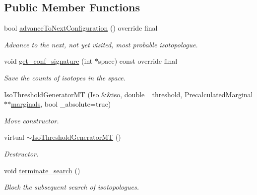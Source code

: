 \subsection*{Public Member Functions}
\begin{DoxyCompactItemize}
\item 
bool \mbox{\hyperlink{class_iso_spec_1_1_iso_threshold_generator_m_t_ab82a60de126aa926b2baf67c49015c22}{advance\+To\+Next\+Configuration}} () override final
\begin{DoxyCompactList}\small\item\em Advance to the next, not yet visited, most probable isotopologue. \end{DoxyCompactList}\item 
void \mbox{\hyperlink{class_iso_spec_1_1_iso_threshold_generator_m_t_a7c398ea67338f0d446de73ec6670dbf5}{get\+\_\+conf\+\_\+signature}} (int $\ast$space) const override final
\begin{DoxyCompactList}\small\item\em Save the counts of isotopes in the space. \end{DoxyCompactList}\item 
\mbox{\label{class_iso_spec_1_1_iso_threshold_generator_m_t_a557fc9c693ddd9980151ff6250f80fc0}} 
\mbox{\hyperlink{class_iso_spec_1_1_iso_threshold_generator_m_t_a557fc9c693ddd9980151ff6250f80fc0}{Iso\+Threshold\+Generator\+MT}} (\mbox{\hyperlink{class_iso_spec_1_1_iso}{Iso}} \&\&iso, double \+\_\+threshold, \mbox{\hyperlink{class_iso_spec_1_1_precalculated_marginal}{Precalculated\+Marginal}} $\ast$$\ast$\mbox{\hyperlink{class_iso_spec_1_1_iso_aea98a8331a2f8a1a6bbcace6124fcfae}{marginals}}, bool \+\_\+absolute=true)
\begin{DoxyCompactList}\small\item\em Move constructor. \end{DoxyCompactList}\item 
\mbox{\label{class_iso_spec_1_1_iso_threshold_generator_m_t_a761bc9e2421c3098cf55c800ddc9908c}} 
virtual \mbox{\hyperlink{class_iso_spec_1_1_iso_threshold_generator_m_t_a761bc9e2421c3098cf55c800ddc9908c}{$\sim$\+Iso\+Threshold\+Generator\+MT}} ()
\begin{DoxyCompactList}\small\item\em Destructor. \end{DoxyCompactList}\item 
\mbox{\label{class_iso_spec_1_1_iso_threshold_generator_m_t_a43d32039cf98798ea3b0b347673fe6ad}} 
void \mbox{\hyperlink{class_iso_spec_1_1_iso_threshold_generator_m_t_a43d32039cf98798ea3b0b347673fe6ad}{terminate\+\_\+search}} ()
\begin{DoxyCompactList}\small\item\em Block the subsequent search of isotopologues. \end{DoxyCompactList}\end{DoxyCompactItemize}
